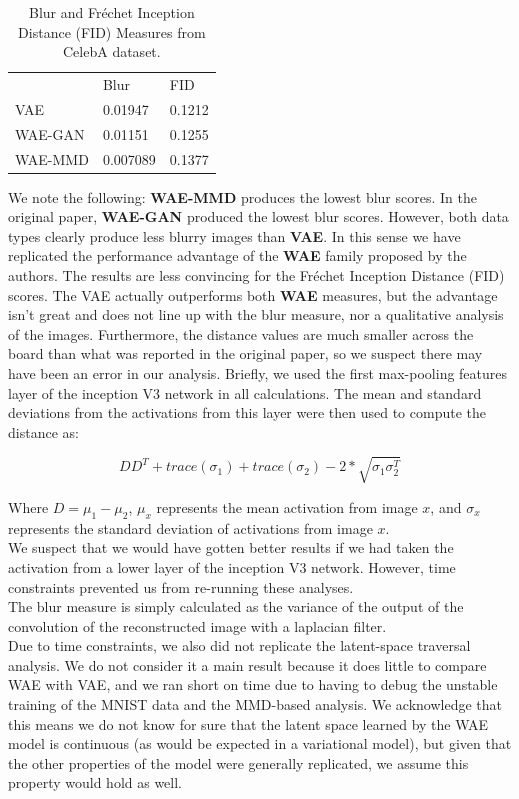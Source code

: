 \documentclass[12pt,english]{amsart}
\begin{document}
\begin{table}[]
\centering
\caption{Blur and Fr\'echet Inception Distance (FID) Measures from CelebA dataset.}
\label{Table 1}
\begin{tabular}{lll}
        & Blur     & FID    \\
VAE     & 0.01947  & 0.1212 \\
WAE-GAN & 0.01151  & 0.1255 \\
WAE-MMD & 0.007089 & 0.1377
\end{tabular}
\end{table}

We note the following: \textbf{WAE-MMD} produces the lowest blur scores. In the
original paper, \textbf{WAE-GAN} produced the lowest blur scores. However, both
data types clearly produce less blurry images than \textbf{VAE}. In this sense
we have replicated the performance advantage of the \textbf{WAE} family proposed
by the authors. The results are less convincing for the Fr\'echet Inception
Distance (FID) scores. The VAE actually outperforms both \textbf{WAE} measures,
but the advantage isn't great and does not line up with the blur measure, nor
a qualitative analysis of the images. Furthermore, the distance values are much
smaller across the board than what was reported in the original paper, so we
suspect there may have been an error in our analysis. Briefly, we used the first
max-pooling features layer of the inception V3 network in all calculations. The
mean and standard deviations from the activations from this layer were then
used to compute the distance as:

$$ D D^T + trace(\sigma_1) + trace(\sigma_2) - 2 * \sqrt{\sigma_1 \sigma_2^T} $$

Where $D = \mu_1 - \mu_2$, $\mu_x$ represents the mean activation from image $x$,
and $\sigma_x$ represents the standard deviation of activations from image $x$. \\

We suspect that we would have gotten better results if we had taken the activation
from a lower layer of the inception V3 network. However, time constraints prevented
us from re-running these analyses. \\

The blur measure is simply calculated as the variance of the output of the
convolution of the reconstructed image with a laplacian filter. \\

Due to time constraints, we also did not replicate the latent-space traversal
analysis. We do not consider it a main result because it does little to compare
WAE with VAE, and we ran short on time due to having to debug the unstable
training of the MNIST data and the MMD-based analysis. We acknowledge that this
means we do not know for sure that the latent space learned by the WAE model is
continuous (as would be expected in a variational model), but given that
the other properties of the model were generally replicated, we assume this
property would hold as well.
\end{document}
